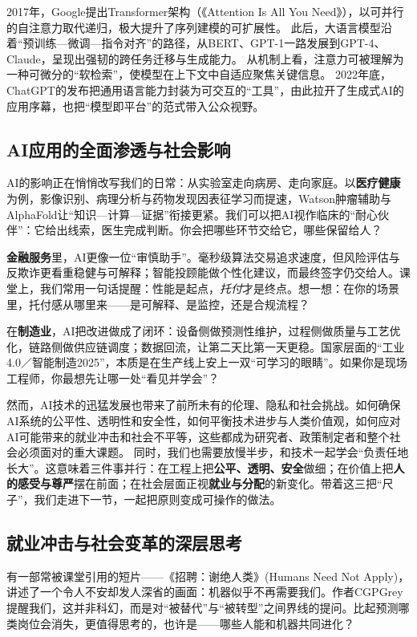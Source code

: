2017年，Google提出Transformer架构（《Attention Is All You Need》），以可并行的自注意力取代递归，极大提升了序列建模的可扩展性。 
此后，大语言模型沿着“预训练—微调—指令对齐”的路径，从BERT、GPT-1一路发展到GPT-4、Claude，呈现出强韧的跨任务迁移与生成能力。 
从机制上看，注意力可被理解为一种可微分的“软检索”，使模型在上下文中自适应聚焦关键信息。 
2022年底，ChatGPT的发布把通用语言能力封装为可交互的“工具”，由此拉开了生成式AI的应用序幕，也把“模型即平台”的范式带入公众视野。

\subsection{AI应用的全面渗透与社会影响}

AI的影响正在悄悄改写我们的日常：从实验室走向病房、走向家庭。以{\bf 医疗健康}为例，影像识别、病理分析与药物发现因表征学习而提速，Watson肿瘤辅助与AlphaFold让“知识—计算—证据”衔接更紧。我们可以把AI视作临床的“耐心伙伴”：它给出线索，医生完成判断。你会把哪些环节交给它，哪些保留给人？

{\bf 金融服务}里，AI更像一位“审慎助手”。毫秒级算法交易追求速度，但风险评估与反欺诈更看重稳健与可解释；智能投顾能做个性化建议，而最终签字仍交给人。课堂上，我们常用一句话提醒：性能是起点，{\it 托付}才是终点。想一想：在你的场景里，托付感从哪里来——是可解释、是监控，还是合规流程？

在{\bf 制造业}，AI把改进做成了闭环：设备侧做预测性维护，过程侧做质量与工艺优化，链路侧做供应链调度；数据回流，让第二天比第一天更稳。国家层面的“工业4.0／智能制造2025”，本质是在生产线上安上一双“可学习的眼睛”。如果你是现场工程师，你最想先让哪一处“看见并学会”？

然而，AI技术的迅猛发展也带来了前所未有的伦理、隐私和社会挑战。如何确保AI系统的公平性、透明性和安全性，如何平衡技术进步与人类价值观，如何应对AI可能带来的就业冲击和社会不平等，这些都成为研究者、政策制定者和整个社会必须面对的重大课题。
同时，我们也需要放慢半步，和技术一起学会“负责任地长大”。这意味着三件事并行：在工程上把{\bf 公平、透明、安全}做细；在价值上把{\bf 人的感受与尊严}摆在前面；在社会层面正视{\bf 就业与分配}的新变化。带着这三把“尺子”，我们走进下一节，一起把原则变成可操作的做法。

\subsection{就业冲击与社会变革的深层思考}

有一部常被课堂引用的短片——《招聘：谢绝人类》(Humans Need Not Apply)，讲述了一个令人不安却发人深省的画面：机器似乎不再需要我们。作者CGPGrey提醒我们，这并非科幻，而是对“被替代”与“被转型”之间界线的提问。比起预测哪类岗位会消失，更值得思考的，也许是——哪些人能和机器共同进化？

